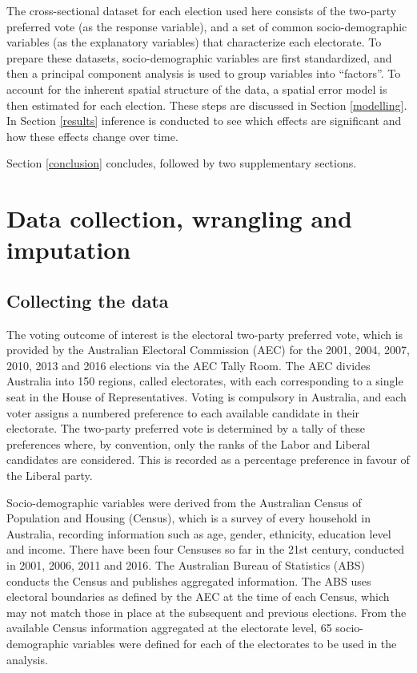 \documentclass[11pt,a4paper,]{article}
\begin{document}
The cross-sectional dataset for each election used here consists of the
two-party preferred vote (as the response variable), and a set of common
socio-demographic variables (as the explanatory variables) that
characterize each electorate. To prepare these datasets,
socio-demographic variables are first standardized, and then a principal
component analysis is used to group variables into ``factors''. To
account for the inherent spatial structure of the data, a spatial error
model is then estimated for each election. These steps are discussed in
Section \ref{modelling}. In Section \ref{results} inference is conducted
to see which effects are significant and how these effects change over
time.

Section \ref{conclusion} concludes, followed by two supplementary
sections.

\section{Data collection, wrangling and imputation}\label{data}

\subsection{Collecting the data}\label{collecting-the-data}

The voting outcome of interest is the electoral two-party preferred
vote, which is provided by the Australian Electoral Commission (AEC) for
the 2001, 2004, 2007, 2010, 2013 and 2016 elections via the AEC Tally
Room. The AEC divides Australia into 150 regions, called electorates,
with each corresponding to a single seat in the House of
Representatives. Voting is compulsory in Australia, and each voter
assigns a numbered preference to each available candidate in their
electorate. The two-party preferred vote is determined by a tally of
these preferences where, by convention, only the ranks of the Labor and
Liberal candidates are considered. This is recorded as a percentage
preference in favour of the Liberal party.

Socio-demographic variables were derived from the Australian Census of
Population and Housing (Census), which is a survey of every household in
Australia, recording information such as age, gender, ethnicity,
education level and income. There have been four Censuses so far in the
21st century, conducted in 2001, 2006, 2011 and 2016. The Australian
Bureau of Statistics (ABS) conducts the Census and publishes aggregated
information. The ABS uses electoral boundaries as defined by the AEC at
the time of each Census, which may not match those in place at the
subsequent and previous elections. From the available Census information
aggregated at the electorate level, 65 socio-demographic variables were
defined for each of the electorates to be used in the analysis.
\end{document}
